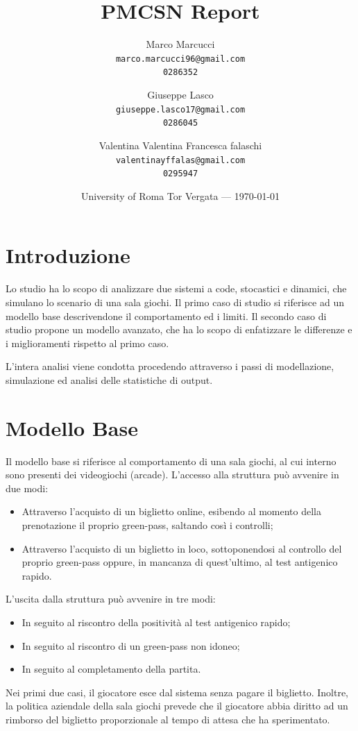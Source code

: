 \documentclass{article}
\title{PMCSN Report} %
\author{Marco Marcucci\\ \texttt{marco.marcucci96@gmail.com}\\ \texttt{0286352} \and Giuseppe Lasco\\ \texttt{giuseppe.lasco17@gmail.com}\\ \texttt{0286045} \and Valentina Valentina Francesca falaschi\\ \texttt{valentinayffalas@gmail.com}\\ \texttt{0295947}} %
\date{University of Roma Tor Vergata --- \today} %
\begin{document}
\maketitle %




\section*{Introduzione} %
Lo studio ha lo scopo di analizzare due sistemi a code, stocastici e dinamici, che simulano lo scenario di una sala giochi. Il primo caso di studio si riferisce ad un modello base descrivendone il comportamento ed i limiti. Il secondo caso di studio propone un modello avanzato, che ha lo scopo di enfatizzare le differenze e i miglioramenti rispetto al primo caso.
\par L'intera analisi viene condotta procedendo attraverso i passi di modellazione, simulazione ed analisi delle statistiche di output.





\section{Modello Base} %

Il modello base si riferisce al comportamento di una sala giochi, al cui interno sono presenti dei videogiochi (arcade). L'accesso alla struttura può avvenire in due modi:
\begin{itemize}
\item Attraverso l'acquisto di un biglietto online, esibendo al momento della prenotazione il proprio green-pass, saltando così i controlli;
\item Attraverso l'acquisto di un biglietto in loco, sottoponendosi al controllo del proprio green-pass oppure, in mancanza di quest'ultimo, al test antigenico rapido. 
\end{itemize}
L'uscita dalla struttura può avvenire in tre modi:
\begin{itemize}
\item In seguito al riscontro della positività al test antigenico rapido;
\item In seguito al riscontro di un green-pass non idoneo;
\item In seguito al completamento della partita.
\end{itemize}
Nei primi due casi, il giocatore esce dal sistema senza pagare il biglietto.
Inoltre, la politica aziendale della sala giochi prevede che il giocatore abbia diritto ad un rimborso del biglietto proporzionale al tempo di attesa che ha sperimentato.
\end{document}
